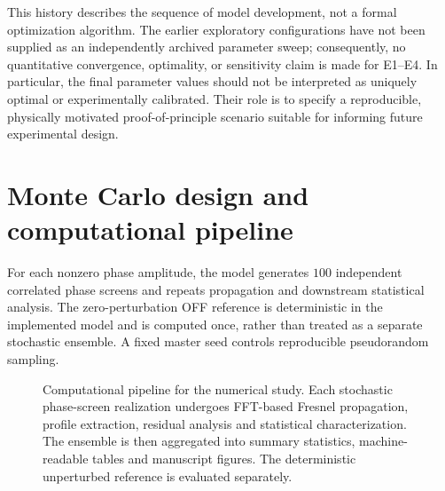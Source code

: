 \documentclass[11pt,a4paper]{article}
\begin{document}
This history describes the sequence of model development, not a formal optimization algorithm. The earlier exploratory configurations have not been supplied as an independently archived parameter sweep; consequently, no quantitative convergence, optimality, or sensitivity claim is made for E1--E4. In particular, the final parameter values should not be interpreted as uniquely optimal or experimentally calibrated. Their role is to specify a reproducible, physically motivated proof-of-principle scenario suitable for informing future experimental design.

\section{Monte Carlo design and computational pipeline}
For each nonzero phase amplitude, the model generates $100$ independent correlated phase screens and repeats propagation and downstream statistical analysis. The zero-perturbation OFF reference is deterministic in the implemented model and is computed once, rather than treated as a separate stochastic ensemble. A fixed master seed controls reproducible pseudorandom sampling.

\begin{figure}[htbp]
\centering
{}
\caption{Computational pipeline for the numerical study. Each stochastic phase-screen realization undergoes FFT-based Fresnel propagation, profile extraction, residual analysis and statistical characterization. The ensemble is then aggregated into summary statistics, machine-readable tables and manuscript figures. The deterministic unperturbed reference is evaluated separately.}
\label{fig:pipeline}
\end{figure}
\end{document}
